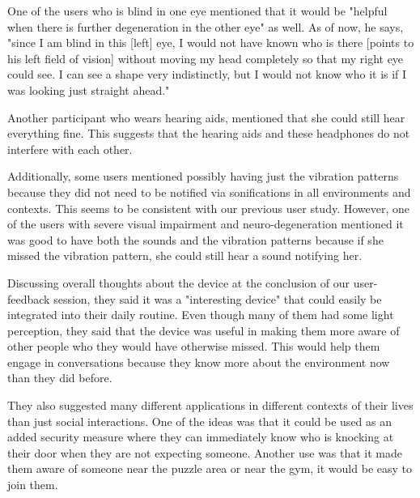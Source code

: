 One of the users who is blind in one eye mentioned that it would be "helpful when there is further degeneration in the other eye" as well. As of now, he says, "since I am blind in this [left] eye, I would not have known who is there [points to his left field of vision] without moving my head completely so that my right eye could see. I can see a shape very indistinctly, but I would not know who it is if I was looking just straight ahead." 

Another participant who wears hearing aids, mentioned that she could still hear everything fine. This suggests that the hearing aids and these headphones do not interfere with each other. 
 
Additionally, some users mentioned possibly having just the vibration patterns because they did not need to be notified via sonifications in all environments and contexts. This seems to be consistent with our previous user study. However, one of the users with severe visual impairment and neuro-degeneration mentioned it was good to have both the sounds and the vibration patterns because if she missed the vibration pattern, she could still hear a sound notifying her. 

Discussing overall thoughts about the device at the conclusion of our user-feedback session, they said it was a "interesting device" that could easily be integrated into their daily routine. Even though many of them had some light perception, they said that the device was useful in making them more aware of other people who they would have otherwise missed. This would help them engage in conversations because they know more about the environment now than they did before. 

They also suggested many different applications in different contexts of their lives than just social interactions. One of the ideas was that it could be used as an added security measure where they can immediately know who is knocking at their door when they are not expecting someone. Another use was that it made them aware of someone near the puzzle area or near the gym, it would be easy to join them. 

 

